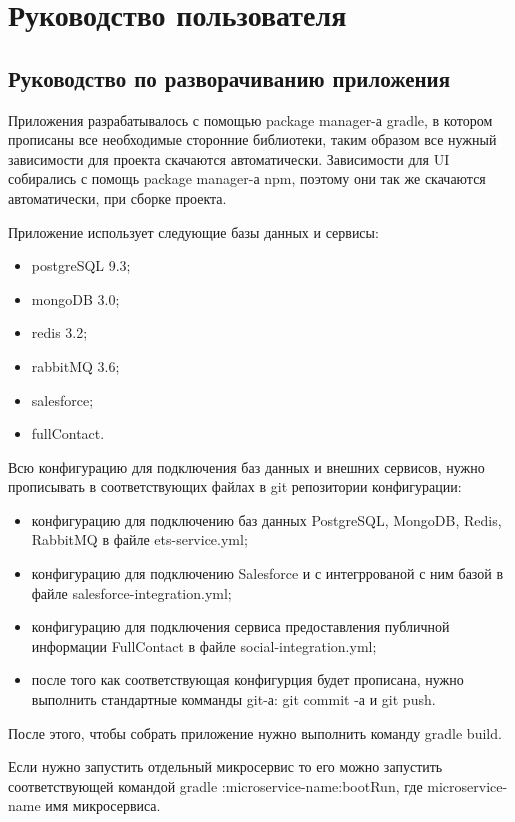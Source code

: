 \section{Руководство пользователя}
\label{sec:manual:intro}

\subsection{Руководство по разворачиванию приложения}
\label{sub:manual:deploy}

Приложения разрабатывалось с помощью package manager-а gradle, в котором прописаны все необходимые сторонние библиотеки, таким образом все нужный зависимости для проекта скачаются автоматически. Зависимости для UI собирались с помощь package manager-а npm, поэтому они так же скачаются автоматически, при сборке проекта.

Приложение использует следующие базы данных и сервисы:
\begin{itemize}
\item postgreSQL 9.3;
\item mongoDB 3.0;
\item redis 3.2;
\item rabbitMQ 3.6;
\item salesforce;
\item fullContact.
\end{itemize}

Всю конфигурацию для подключения баз данных и внешних сервисов, нужно прописывать в соответствующих файлах в git репозитории конфигурации:
\begin{itemize}
\item конфигурацию для подключению баз данных PostgreSQL, MongoDB, Redis, RabbitMQ в файле ets-service.yml;
\item конфигурацию для подключению Salesforce и с интегррованой с ним базой в файле salesforce-integration.yml;
\item конфигурацию для подключения сервиса предоставления публичной информации FullContact в файле social-integration.yml;
\item после того как соответствующая конфигурция будет прописана, нужно выполнить стандартные комманды git-а: git commit -а и git push.
\end{itemize}

После этого, чтобы собрать приложение нужно выполнить команду gradle build.

Если нужно запустить отдельный микросервис то его можно запустить соответствующей командой gradle :{microservice-name}:bootRun, где {microservice-name} имя микросервиса.

